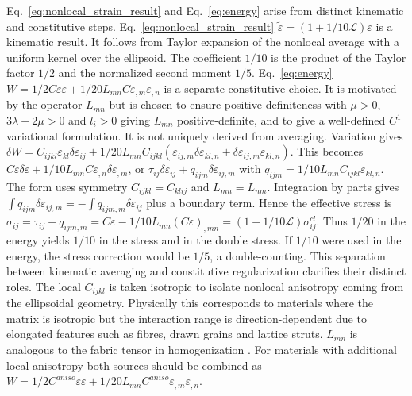\documentclass[final,3p,times,fleqn]{elsarticle}
\newcommand{\rev}[1]{\textcolor{revcolor}{#1}}
\begin{document}
\rev{Eq.~\eqref{eq:nonlocal_strain_result} and Eq.~\eqref{eq:energy} arise from distinct kinematic and constitutive steps. Eq.~\eqref{eq:nonlocal_strain_result} $\tilde{\varepsilon}=(1+1/10\mathcal{L})\varepsilon$ is a kinematic result. It follows from Taylor expansion of the nonlocal average with a uniform kernel over the ellipsoid. The coefficient $1/10$ is the product of the Taylor factor $1/2$ and the normalized second moment $1/5$. Eq.~\eqref{eq:energy} $W=1/2C\varepsilon\varepsilon+1/20 L_{mn}C\varepsilon_{,m}\varepsilon_{,n}$ is a separate constitutive choice. It is motivated by the operator $L_{mn}$ but is chosen to ensure positive-definiteness with $\mu>0$, $3\lambda+2\mu>0$ and $l_i>0$ giving $L_{mn}$ positive-definite, and to give a well-defined $C^1$ variational formulation. It is not uniquely derived from averaging. Variation gives $\delta W = C_{ijkl}\varepsilon_{kl}\delta\varepsilon_{ij}+1/20 L_{mn}C_{ijkl}(\varepsilon_{ij,m}\delta\varepsilon_{kl,n}+\delta\varepsilon_{ij,m}\varepsilon_{kl,n})$. This becomes $C\varepsilon\delta\varepsilon+1/10 L_{mn}C\varepsilon_{,n}\delta\varepsilon_{,m}$, or $\tau_{ij}\delta\varepsilon_{ij}+q_{ijm}\delta\varepsilon_{ij,m}$ with $q_{ijm}=1/10 L_{mn}C_{ijkl}\varepsilon_{kl,n}$. The form uses symmetry $C_{ijkl}=C_{klij}$ and $L_{mn}=L_{nm}$. Integration by parts gives $\int q_{ijm}\delta\varepsilon_{ij,m}=-\int q_{ijm,m}\delta\varepsilon_{ij}$ plus a boundary term. Hence the effective stress is $\sigma_{ij}=\tau_{ij}-q_{ijm,m}=C\varepsilon-1/10 L_{mn}(C\varepsilon)_{,mn}=(1-1/10\mathcal{L})\sigma^{cl}_{ij}$. Thus $1/20$ in the energy yields $1/10$ in the stress and in the double stress. If $1/10$ were used in the energy, the stress correction would be $1/5$, a double-counting. This separation between kinematic averaging and constitutive regularization clarifies their distinct roles. The local $C_{ijkl}$ is taken isotropic to isolate nonlocal anisotropy coming from the ellipsoidal geometry. Physically this corresponds to materials where the matrix is isotropic but the interaction range is direction-dependent due to elongated features such as fibres, drawn grains and lattice struts. $L_{mn}$ is analogous to the fabric tensor in homogenization \cite{LazarPo2015,Polizzotto2018,Auffray2019}. For materials with additional local anisotropy both sources should be combined as $W=1/2 C^{aniso}\varepsilon\varepsilon+1/20 L_{mn}C^{aniso}\varepsilon_{,m}\varepsilon_{,n}$.}
\end{document}
